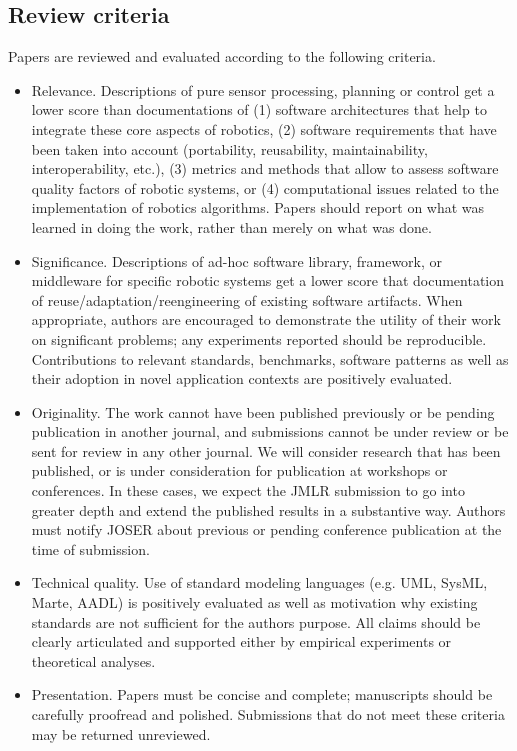 \documentclass[10pt,journal,compsoc]{joser1}
\begin{document}
\subsection{Review criteria}
Papers are reviewed and evaluated according to the following criteria.
\begin{itemize}
    \item Relevance. Descriptions of pure sensor processing, planning or control get a lower score than documentations of (1) software architectures that help to integrate these core aspects of robotics, (2) software requirements that have been taken into account (portability, reusability, maintainability, interoperability, etc.), (3) metrics and methods that allow to assess software quality factors of robotic systems, or (4) computational issues related to the implementation of robotics algorithms. Papers should report on what was learned in doing the work, rather than merely on what was done.
    \item Significance. Descriptions of ad-hoc software library, framework, or middleware for specific robotic systems get a lower score that documentation of reuse/adaptation/reengineering of existing software artifacts. When appropriate, authors are encouraged to demonstrate the utility of their work on significant problems; any experiments reported should be     reproducible. Contributions to relevant standards, benchmarks, software patterns as well as their adoption in novel application contexts are positively evaluated.
    \item Originality. The work cannot have been published previously or be pending publication in another journal, and submissions cannot be under review or be sent for review in any other journal. We will consider research that has been published, or is under consideration for publication at workshops or conferences. In these cases, we expect the JMLR submission to go into greater depth and extend the published results in a substantive way. Authors must notify JOSER about previous or pending conference publication at the time of submission.
    \item Technical quality. Use of standard modeling languages (e.g. UML, SysML, Marte, AADL) is positively evaluated as well as motivation why existing standards are not sufficient for the authors purpose. All claims should be clearly articulated and supported either by empirical experiments or theoretical analyses.
    \item Presentation. Papers must be concise and complete; manuscripts should be carefully proofread and polished. Submissions that do not meet these criteria may be returned unreviewed.
\end{itemize}
\end{document}
